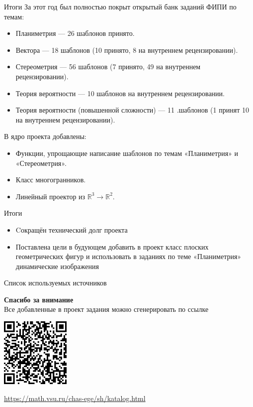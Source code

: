 \documentclass[aspectratio=169,12pt]{beamer}
\begin{document}
\begin{frame}{Итоги}
За этот год был полностью покрыт открытый банк заданий ФИПИ по темам:
		      \begin{itemize}
			      \item Планиметрия — 26 шаблонов принято.
			      \item Вектора — 18 шаблонов (10 принято, 8 на внутреннем рецензировании).
			      \item Стереометрия — 56 шаблонов (7 принято, 49 на внутреннем рецензировании).
			      \item Теория вероятности — 10 шаблонов на внутреннем рецензировании.
			      \item Теория вероятности (повышенной сложности) — 11 .шаблонов (1 принят 10 на внутреннем рецензировании).
		      \end{itemize}

В ядро проекта добавлены: 
\begin{itemize}
    \item Функции, упрощающие написание шаблонов по темам «Планиметрия» и  «Стереометрия».
    \item Класс многогранников.
    \item Линейный проектор из $\mathbb{R}^3 \to \mathbb{R}^2$.
\end{itemize}

\end{frame}

\begin{frame}{Итоги}
	\begin{itemize}
		\item Cокращён технический долг проекта
		\item Поставлена цели в будующем добавить в проект класс плоских геометрических фигур и использовать в заданиях по теме «Планиметрия» динамические изображения
\end{itemize}
\end{frame}

\begin{frame}{Список используемых источников}
	
\end{frame}

\begin{frame}
	\center\large\textcolor{NordBrightBlue}{\textbf{Спасибо за внимание}}\\
	\hfill \break
	\normalsize
	Все добавленные в проект задания можно сгенерировать по ссылке\\
	\hfill \break

	\includegraphics[width=0.25\textwidth]{QR-code}\\
	\hfill \break

	\url{https://math.vsu.ru/chas-ege/sh/katalog.html}
\end{frame}
\end{document}
